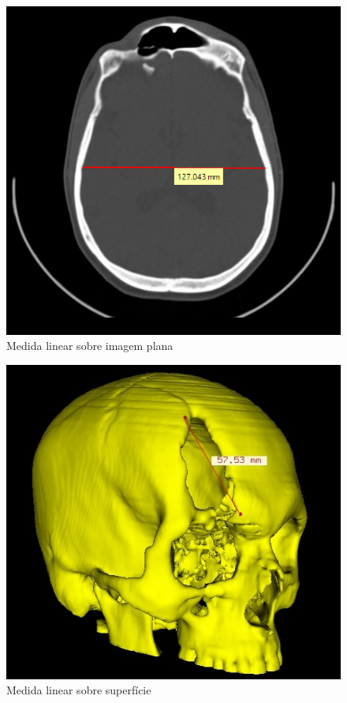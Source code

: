 \begin{figure}[!htb]
\centering
\includegraphics[scale=0.4]{../user_guide_figures/invesalius_screen/axial_linear.png}
\caption{Medida linear sobre imagem plana}
\label{fig:axial_linear}
\end{figure}

\begin{figure}[!htb]
\centering
\includegraphics[scale=0.3]{../user_guide_figures/invesalius_screen/3d_linear.jpg}
\caption{Medida linear sobre superfície}
\label{fig:3d_linear}
\end{figure}

